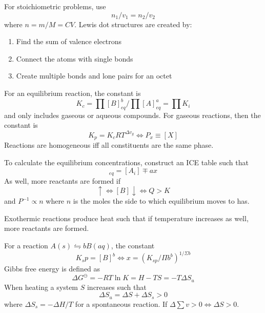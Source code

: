 \documentclass{article}
\begin{document}
\begin{multicols*}{2}

For stoichiometric problems, use
\begin{equation}
  n_1/v_1 = n_2/v_2
\end{equation}
where $n = m/M = CV$. Lewis dot structures are created by:
\begin{enumerate}
  \item Find the sum of valence electrons
  \item Connect the atoms with single bonds
  \item Create multiple bonds and lone pairs for an octet
\end{enumerate}
For an equilibrium reaction, the constant is
\begin{equation}
  K_c = \textstyle\prod [B]_{eq}^b / \textstyle\prod [A]_{eq}^a = \textstyle\prod K_i
\end{equation}
and only includes gaseous or aqueous compounds. For gaseous reactions, then the constant is
\begin{equation}
  K_p = K_c RT ^{\Delta v_g} \iff P_x \equiv [X]
\end{equation}
Reactions are homogeneous iff all constituents are the same phase.

\bigskip
To calculate the equilibrium concentrations, construct an ICE table such that
\begin{equation}
  [X_i]_{eq} = [A_i] \mp ax
\end{equation}
As well, more reactants are formed if
\begin{equation}
  [A] \uparrow \iff [B] \downarrow \iff Q > K
\end{equation}
and $P^{-1} \propto n$ where $n$ is the moles the side to which equilibrium moves to has.

\bigskip
Exothermic reactions produce heat such that if temperature increases as well, more reactants are formed.

\bigskip
For a reaction $A(s) \leftrightharpoons bB(aq)$, the constant
\begin{equation}
  K_sp = [B]^b \iff x = (K_{sp}/\Pi b^b)^{1/\Sigma b}
\end{equation}
Gibbs free energy is defined as
\begin{equation}
  \Delta G^\ominus = -RT \ln K = H - TS = -T \Delta S_u
\end{equation}
When heating a system $S$ increases such that \begin{equation}
  \Delta S_u = \Delta S + \Delta S_s >0
\end{equation}
where $\Delta S_s = - \Delta H/T$ for a spontaneous reaction. If $\Delta \sum v > 0 \iff \Delta S > 0$.


\end{multicols*}
\end{document}
